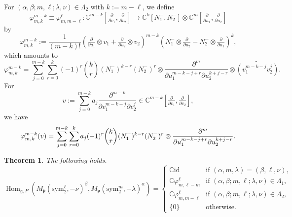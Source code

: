\documentclass[reqno,11pt]{amsart}
\newtheorem{thm}[equation]{Theorem}
\theoremstyle{remark}
\numberwithin{equation}{section}
\newcommand{\gb}{\beta}
\newcommand{\ga}{\alpha}
\newcommand{\gL}{\Lambda}
\newcommand{\fg}{{\mathfrak g}}
\newcommand{\fp}{{\mathfrak p}}
\newcommand{\C}{\mathbb{C}}
\newcommand{\Hom}{\operatorname{Hom}}
\newcommand{\To}{\longrightarrow}
\newcommand{\sym}{\mathrm{sym}}
\newcommand{\id}{\mathrm{id}}
\begin{document}
For $(\ga, \gb; m, \ell; \lambda,\nu) \in \gL_2$ with $k:=m-\ell$,
we define
\begin{equation*}
\varphi_{m,k}^{m-k}
\equiv
\varphi_{m,m-\ell}^{\ell} 
\colon 
\C^{m-k}\left[\tfrac{\partial}{\partial v_1}, \tfrac{\partial}{\partial v_2}\right]
\To
\C^k[N_1^-, N_2^-]
\otimes \C^m\left[\tfrac{\partial}{\partial u_1}, \tfrac{\partial}{\partial u_2}\right]
\end{equation*}
by
\begin{equation}\label{eqn:gP2}
\varphi_{m,k}^{m-k} :=
\frac{1}{(m-k)!}
\left(\tfrac{\partial}{\partial u_1}\otimes v_1 + \tfrac{\partial}{\partial u_2}\otimes v_2\right)^{m-k}
\left(N_1^-\otimes\tfrac{\partial}{\partial u_2} - N_2^-\otimes \tfrac{\partial}{\partial u_1}\right)^k,
\end{equation}
which amounts to
\begin{equation*}
\varphi_{m,k}^{m-k}
=
\sum_{j=0}^{m-k}\sum_{r=0}^k
(-1)^r
\binom{k}{r}
(N_1^-)^{k-r}(N_2^-)^r
\otimes \frac{\partial^{m}}{\partial u_1^{m-k-j+r}\partial u_2^{k+j-r}}
\otimes \widetilde{\left(v_1^{m-k-j}v_2^{j}\right)}.
\end{equation*}
For 
\begin{equation*}
v:= \sum_{j=0}^{m-k} a_{j} 
\frac{\partial^{m-k}}{\partial v_1^{m-k-j} \partial v_2^{j}}
\in
\C^{m-k}\left[\tfrac{\partial}{\partial v_1}, \tfrac{\partial}{\partial v_2}\right],
\end{equation*}
we have 
\begin{equation*}
\varphi_{m,k}^{m-k}(v)
=
\sum_{j=0}^{m-k}\sum_{r=0}^k
a_j(-1)^r 
\binom{k}{r}
(N_1^-)^{k-r}(N_2^-)^r
\otimes \frac{\partial^m}{\partial u_1^{m-k-j+r}\partial u_2^{k+j-r}}.\\[3pt]
\end{equation*}


\begin{thm}\label{thm:gP2}
The following holds.
\begin{equation*}
\Hom_{\fg,P}(M_\fp(\sym_2^{\ell},-\nu)^{\gb},
M_\fp(\sym_2^m, -\lambda)^\ga)
=
\begin{cases}
\C\id & \text{if $(\ga, m, \lambda) = (\gb, \ell, \nu)$},\\[3pt]
\C\varphi_{m,\ell-m}^{\ell} &\text{if $(\ga, \gb; m,\ell ; \lambda, \nu) \in \gL_1$},\\[3pt]
\C\varphi_{m,m-\ell}^{\ell} &\text{if $(\ga, \gb; m,\ell ; \lambda, \nu) \in \gL_2$},\\
\{0\} &\text{otherwise}.
\end{cases}
\end{equation*}
\end{thm}
\end{document}
